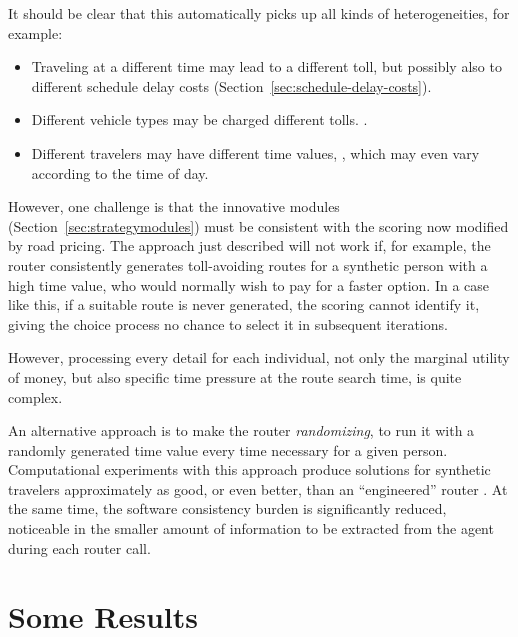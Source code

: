 It should be clear that this automatically picks up all kinds of heterogeneities, for example:
\begin{itemize}\styleItemize
\item Traveling at a different time may lead to a different toll, but possibly also to different schedule delay costs (Section~\ref{sec:schedule-delay-costs}). 
\item Different vehicle types may be charged different tolls. \citep{KickhoeferNagel2012EmissionInternalization}.
\item Different travelers may have different time values, \citep{NagelKickhoeferJoubert2014HeterogeneousVoTsPROCEDIA}, which may even vary according to the time of day.
\end{itemize}

However, one challenge is that the innovative modules (Section~\ref{sec:strategymodules}) must be consistent with the scoring now modified by road pricing. The approach just described will not work if, for example, the router consistently generates toll-avoiding routes for a synthetic person with a high time value,  who would normally wish to pay for a faster option. In a case like this, if a suitable route is never generated, the scoring cannot identify it, giving  the choice process no chance to select it in subsequent iterations.

However, processing every detail for each individual, \ie not only the marginal utility of money, but also specific time pressure at the route search time, is quite complex.

An alternative approach is to make the router \emph{randomizing}, \ie to run it with a randomly generated time value every time necessary for a given person. Computational experiments with this approach produce solutions for synthetic travelers approximately as good, or even better, than an ``engineered'' router \citep{NagelKickhoeferJoubert2014HeterogeneousVoTsPROCEDIA}. At the same time, the software consistency burden is significantly reduced, noticeable in the smaller amount of information to be extracted from the agent during each router call.

\section{Some Results}
